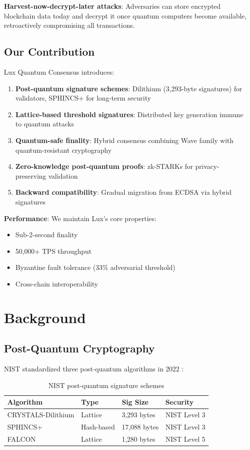 \documentclass[11pt,letterpaper]{article}
\begin{document}
\textbf{Harvest-now-decrypt-later attacks}: Adversaries can store encrypted blockchain data today and decrypt it once quantum computers become available, retroactively compromising all transactions.

\subsection{Our Contribution}

Lux Quantum Consensus introduces:

\begin{enumerate}
    \item \textbf{Post-quantum signature schemes}: Dilithium (3,293-byte signatures) for validators, SPHINCS+ for long-term security
    \item \textbf{Lattice-based threshold signatures}: Distributed key generation immune to quantum attacks
    \item \textbf{Quantum-safe finality}: Hybrid consensus combining Wave family with quantum-resistant cryptography
    \item \textbf{Zero-knowledge post-quantum proofs}: zk-STARKs for privacy-preserving validation
    \item \textbf{Backward compatibility}: Gradual migration from ECDSA via hybrid signatures
\end{enumerate}

\textbf{Performance}: We maintain Lux's core properties:
\begin{itemize}
    \item Sub-2-second finality
    \item 50,000+ TPS throughput
    \item Byzantine fault tolerance (33\% adversarial threshold)
    \item Cross-chain interoperability
\end{itemize}

\section{Background}

\subsection{Post-Quantum Cryptography}

NIST standardized three post-quantum algorithms in 2022 \cite{nist2022}:

\begin{table}[h]
\centering
\begin{tabular}{llll}
\toprule
\textbf{Algorithm} & \textbf{Type} & \textbf{Sig Size} & \textbf{Security} \\
\midrule
CRYSTALS-Dilithium & Lattice & 3,293 bytes & NIST Level 3 \\
SPHINCS+ & Hash-based & 17,088 bytes & NIST Level 3 \\
FALCON & Lattice & 1,280 bytes & NIST Level 5 \\
\bottomrule
\end{tabular}
\caption{NIST post-quantum signature schemes}
\end{table}
\end{document}
